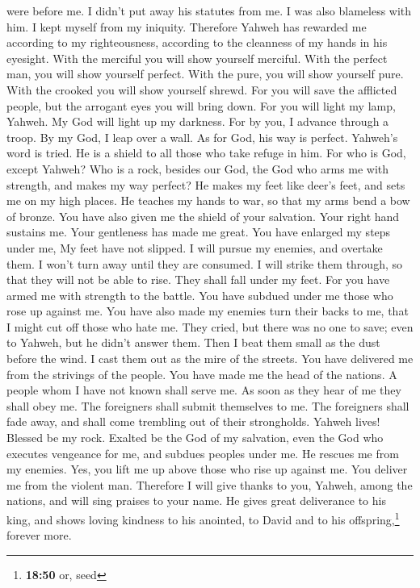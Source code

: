 were before me. I didn't put away his statutes from me. 
I was also blameless with him. I kept myself from my iniquity.
 Therefore Yahweh has rewarded me according to my
righteousness, according to the cleanness of my hands in his eyesight.
 With the merciful you will show yourself merciful. With
the perfect man, you will show yourself perfect.  With
the pure, you will show yourself pure. With the crooked you will show
yourself shrewd.  For you will save the afflicted people,
but the arrogant eyes you will bring down.  For you will
light my lamp, Yahweh. My God will light up my darkness. 
For by you, I advance through a troop. By my God, I leap over a wall.
 As for God, his way is perfect. Yahweh's word is tried.
He is a shield to all those who take refuge in him.  For
who is God, except Yahweh? Who is a rock, besides our God,
 the God who arms me with strength, and makes my way
perfect?  He makes my feet like deer's feet, and sets me
on my high places.  He teaches my hands to war, so that
my arms bend a bow of bronze.  You have also given me the
shield of your salvation. Your right hand sustains me. Your gentleness
has made me great.  You have enlarged my steps under me,
My feet have not slipped.  I will pursue my enemies, and
overtake them. I won't turn away until they are consumed.
 I will strike them through, so that they will not be
able to rise. They shall fall under my feet.  For you
have armed me with strength to the battle. You have subdued under me
those who rose up against me.  You have also made my
enemies turn their backs to me, that I might cut off those who hate me.
 They cried, but there was no one to save; even to
Yahweh, but he didn't answer them.  Then I beat them
small as the dust before the wind. I cast them out as the mire of the
streets.  You have delivered me from the strivings of the
people. You have made me the head of the nations. A people whom I have
not known shall serve me.  As soon as they hear of me
they shall obey me. The foreigners shall submit themselves to me.
 The foreigners shall fade away, and shall come trembling
out of their strongholds.  Yahweh lives! Blessed be my
rock. Exalted be the God of my salvation,  even the God
who executes vengeance for me, and subdues peoples under me.
 He rescues me from my enemies. Yes, you lift me up above
those who rise up against me. You deliver me from the violent man.
 Therefore I will give thanks to you, Yahweh, among the
nations, and will sing praises to your name.  He gives
great deliverance to his king, and shows loving kindness to his
anointed, to David and to his offspring,\footnote{\textbf{18:50} or,
  seed} forever more.

